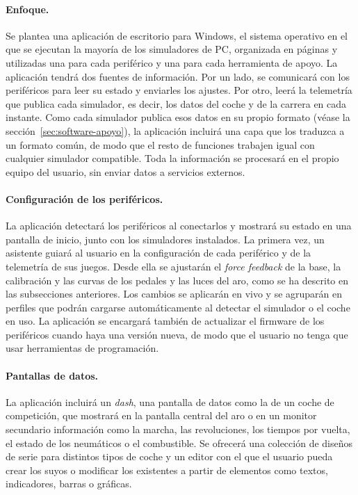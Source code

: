 \paragraph{Enfoque.}
Se plantea una aplicación de escritorio para Windows, el sistema operativo en el que se ejecutan la mayoría de los simuladores de PC, organizada en páginas y utilizadas una para cada periférico y una para cada herramienta de apoyo. La aplicación tendrá dos fuentes de información. Por un lado, se comunicará con los periféricos para leer su estado y enviarles los ajustes. Por otro, leerá la telemetría que publica cada simulador, es decir, los datos del coche y de la carrera en cada instante. Como cada simulador publica esos datos en su propio formato (véase la sección~\ref{sec:software-apoyo}), la aplicación incluirá una capa que los traduzca a un formato común, de modo que el resto de funciones trabajen igual con cualquier simulador compatible. Toda la información se procesará en el propio equipo del usuario, sin enviar datos a servicios externos.

\paragraph{Configuración de los periféricos.}
La aplicación detectará los periféricos al conectarlos y mostrará su estado en una pantalla de inicio, junto con los simuladores instalados. La primera vez, un asistente guiará al usuario en la configuración de cada periférico y de la telemetría de sus juegos. Desde ella se ajustarán el \textit{force feedback} de la base, la calibración y las curvas de los pedales y las luces del aro, como se ha descrito en las subsecciones anteriores. Los cambios se aplicarán en vivo y se agruparán en perfiles que podrán cargarse automáticamente al detectar el simulador o el coche en uso. La aplicación se encargará también de actualizar el firmware de los periféricos cuando haya una versión nueva, de modo que el usuario no tenga que usar herramientas de programación.

\paragraph{Pantallas de datos.}
La aplicación incluirá un \textit{dash}, una pantalla de datos como la de un coche de competición, que mostrará en la pantalla central del aro o en un monitor secundario información como la marcha, las revoluciones, los tiempos por vuelta, el estado de los neumáticos o el combustible. Se ofrecerá una colección de diseños de serie para distintos tipos de coche y un editor con el que el usuario pueda crear los suyos o modificar los existentes a partir de elementos como textos, indicadores, barras o gráficas.

